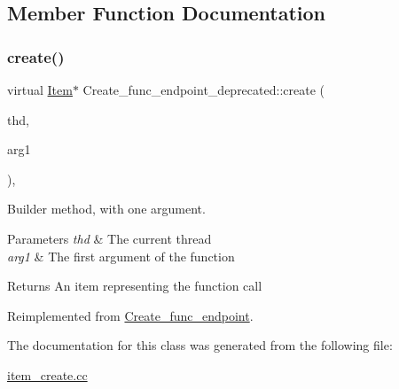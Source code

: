 \subsection{Member Function Documentation}
\mbox{\label{classCreate__func__endpoint__deprecated_ac7c2c610c432d090a6a2935fbc76a1da}} 
\subsubsection{\texorpdfstring{create()}{create()}}
{\footnotesize\ttfamily virtual \mbox{\hyperlink{classItem}{Item}}$\ast$ Create\+\_\+func\+\_\+endpoint\+\_\+deprecated\+::create (\begin{DoxyParamCaption}\item[{T\+HD $\ast$}]{thd,  }\item[{\mbox{\hyperlink{classItem}{Item}} $\ast$}]{arg1 }\end{DoxyParamCaption})\hspace{0.3cm}{\ttfamily [inline]}, {\ttfamily [virtual]}}

Builder method, with one argument. 
\begin{DoxyParams}{Parameters}
{\em thd} & The current thread \\
\hline
{\em arg1} & The first argument of the function \\
\hline
\end{DoxyParams}
\begin{DoxyReturn}{Returns}
An item representing the function call 
\end{DoxyReturn}


Reimplemented from \mbox{\hyperlink{classCreate__func__endpoint_a3e58761794e07878165e882e8d66b7d9}{Create\+\_\+func\+\_\+endpoint}}.



The documentation for this class was generated from the following file\+:\begin{DoxyCompactItemize}
\item 
\mbox{\hyperlink{item__create_8cc}{item\+\_\+create.\+cc}}\end{DoxyCompactItemize}
